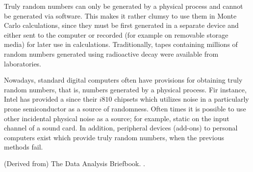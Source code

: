 \documentclass[12pt]{article}
\begin{document}
Truly random numbers can only be generated by a physical process and cannot be generated via software. This makes it rather clumsy to use them in Monte Carlo calculations, since they must be first generated in a separate device and either sent to the computer or recorded (for example on removable storage media) for later use in calculations. Traditionally, tapes containing millions of random  numbers generated using radioactive decay were available from laboratories.  

Nowadays, standard digital computers often have provisions for obtaining truly random numbers, that is, numbers generated by a physical process.  Fir instance, Intel has provided a  since their $i810$ chipsets which utilizes noise in a particularly prone semiconductor as a source of randomness.  Often times it is possible to use other incidental physical noise as a source; for example, static on the input channel of a sound card.  In addition, peripheral devices (add-ons) to personal computers exist which provide truly random numbers, when the previous methods fail.

\begin{thebibliography}{3}

\bibitem (Derived from) The Data Analysis Briefbook.  .

\end{thebibliography}
\end{document}

